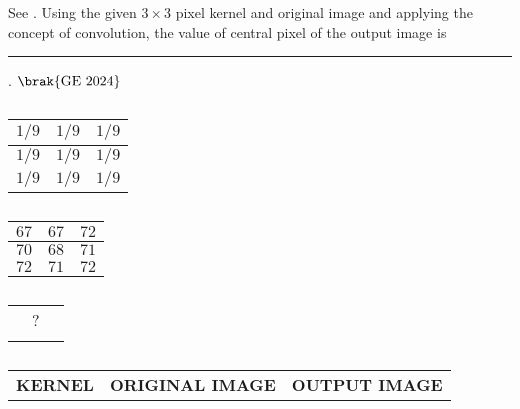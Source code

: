 \item 
    See .
	Using the given $3 \times 3$ pixel kernel and original image and applying the concept of convolution, the value of central pixel of the output image is \rule{2cm}{0.5mm}. 
\hfill $\brak{\text{GE 2024}}$
\begin{table}[H]
    \centering
    \begin{tabular}{|c|c|c|}
        \hline
        $1/9$ & $1/9$ & $1/9$ \\
        \hline
        $1/9$ & $1/9$ & $1/9$ \\
        \hline
        $1/9$ & $1/9$ & $1/9$ \\
        \hline
    \end{tabular}
    \hspace{2cm} %
    \begin{tabular}{|c|c|c|}
    
    \hline
        $67$ & $67$ & $72$ \\
        \hline
        $70$ & $68$ & $71$ \\
        \hline
        $72$ & $71$ & $72$ \\
        \hline
    \end{tabular}
    \hspace{2cm} %
    \begin{tabular}{|c|c|c|}
        \hline
        
& & \\
        \hline
        & \huge{?} & \\
        \hline
        & & \\
        \hline
    \end{tabular}
    
    \vspace{0.5cm} %
    
    \begin{tabular}{c c c}
        \hspace{2cm}
        \textbf{KERNEL} & \hspace{1cm} \textbf{ORIGINAL IMAGE} & \hspace{1cm} \textbf{OUTPUT 
IMAGE}
    \end{tabular}
    \caption{}
    \label{tab:2024/ge}
\end{table}
